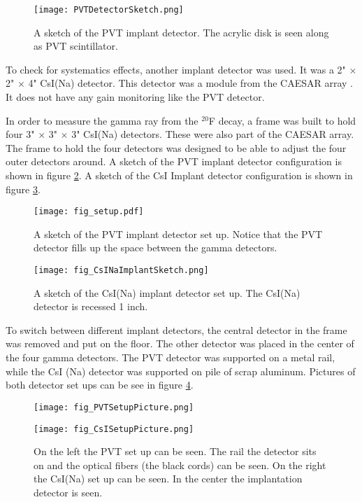 \documentclass[../MaxHughesThesis.tex]{subfiles}
\begin{document}
\begin{figure}
	\centerline{\texttt{[image: PVTDetectorSketch.png]}}
	\caption{A sketch of the PVT implant detector.
		    The acrylic disk is seen along as PVT scintillator. 
		   }
	\label{fig:PVTDetSketch}
\end{figure}
To check for systematics effects, another implant detector was used.
It was a 2" $\times$ 2" $\times$ 4"  CsI(Na) detector. 
This detector was a module from the CAESAR array \cite{Wei10}.
It does not have any gain monitoring like the PVT detector.

In order to measure the gamma ray from the $^{20}$F decay, a frame was built to hold four 3" $\times$ 3" $\times$ 3" CsI(Na) detectors.  
These were also part of the CAESAR array.
The frame to hold the four detectors was designed to be able to adjust the four outer detectors around.
A sketch of the PVT implant detector configuration is shown in figure \ref{fig:detsketch}.
A sketch of the CsI Implant detector configuration is shown in figure \ref{fig:csiimdetsketch}.

\begin{figure}
	\centerline{\texttt{[image: fig\_setup.pdf]}}
	\caption{A sketch of the PVT implant detector set up. 
		 Notice that the PVT detector fills up the space between the gamma detectors.
		 }
	\label{fig:detsketch}
\end{figure}

\begin{figure}
	\centerline{\texttt{[image: fig\_CsINaImplantSketch.png]}}
	\caption{A sketch of the CsI(Na) implant detector set up. 
		    The CsI(Na) detector is recessed 1 inch. 
			}
	\label{fig:csiimdetsketch}
\end{figure}
To switch between different implant detectors, the central detector in the frame was removed and put on the floor.
The other detector was placed in the center of the four gamma detectors.
The PVT detector was supported on a metal rail, while the CsI (Na) detector was supported on pile of scrap aluminum.
Pictures of both detector set ups can be see in figure \ref{fig:PVTPicture}.

\begin{figure}
    \centering
    \begin{minipage}{0.50\textwidth}
	\centerline{\texttt{[image: fig\_PVTSetupPicture.png]}}
    \end{minipage}\hfill
    \begin{minipage}{0.50\textwidth}
	\centerline{\texttt{[image: fig\_CsISetupPicture.png]}}
    \end{minipage}
	\caption{On the left the PVT set up can be seen. 
		 The rail the detector sits on and the optical fibers (the black cords) can be seen.
		 On the right the CsI(Na) set up can be seen.
		 In the center the implantation detector is seen.
		 }
	\label{fig:PVTPicture}
\end{figure}
\end{document}
